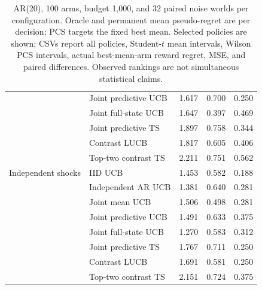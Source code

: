 \begin{table}[p]
\begin{tabular}{llrrr}
 & Joint predictive UCB & 1.617 & 0.700 & 0.250\\
 & Joint full-state UCB & 1.647 & 0.397 & 0.469\\
 & Joint predictive TS & 1.897 & 0.758 & 0.344\\
 & Contrast LUCB & 1.817 & 0.605 & 0.406\\
 & Top-two contrast TS & 2.211 & 0.751 & 0.562\\
\midrule
Independent shocks & IID UCB & 1.453 & 0.582 & 0.188\\
 & Independent AR UCB & 1.381 & 0.640 & 0.281\\
 & Joint mean UCB & 1.506 & 0.498 & 0.281\\
 & Joint predictive UCB & 1.491 & 0.633 & 0.375\\
 & Joint full-state UCB & 1.270 & 0.583 & 0.312\\
 & Joint predictive TS & 1.767 & 0.711 & 0.250\\
 & Contrast LUCB & 1.691 & 0.581 & 0.250\\
 & Top-two contrast TS & 2.151 & 0.724 & 0.375\\
\bottomrule
\end{tabular}


\caption{AR(20), 100 arms, budget 1,000, and 32 paired noise worlds per configuration. Oracle and permanent mean pseudo-regret are per decision; PCS targets the fixed best mean. Selected policies are shown; CSVs report all policies, Student-$t$ mean intervals, Wilson PCS intervals, actual best-mean-arm reward regret, MSE, and paired differences. Observed rankings are not simultaneous statistical claims.}
\label{spatiotemporal_bandits:tab:ar20}
\end{table}

